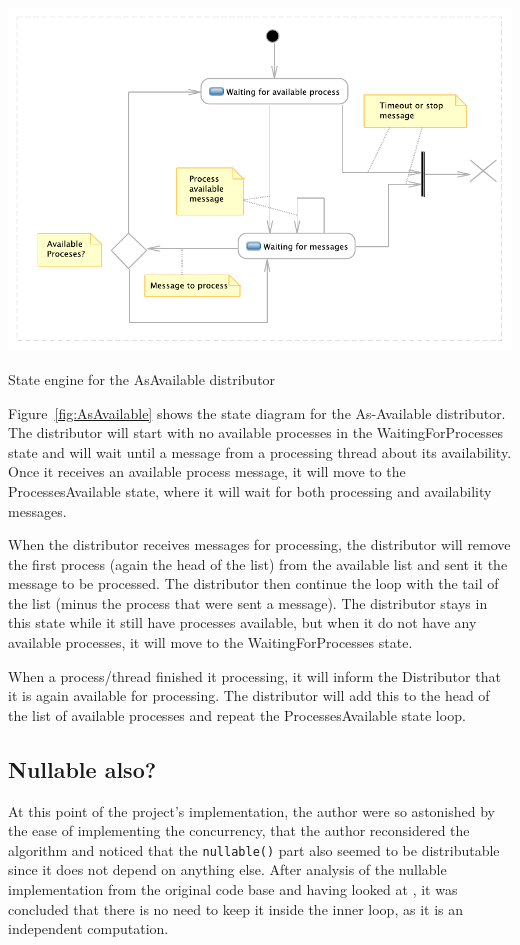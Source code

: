 \documentclass[a4paper,11pt]{report}
\begin{document}
\label{sec:as-available}
\begin{Figure}[htb] %
	 \centering
	 \includegraphics[scale=1]{AsAvailable_states.pdf} 
	 \caption{State engine for the AsAvailable distributor}
	 \label{fig:AsAvailable}
\end{Figure}

Figure~\autoref{fig:AsAvailable} shows the state diagram for the
As-Available distributor. The distributor will start with no available
processes in the WaitingForProcesses state and will wait until a
message from a processing thread about its availability. Once it receives
an available process message, it will move to the ProcessesAvailable
state, where it will wait for both processing and availability messages.

When the distributor receives messages for processing, the distributor
will remove the first process (again the head of the list) from the
available list and sent it the message to be processed. The
distributor then continue the loop with the tail of the list (minus
the process that were sent a message). The distributor stays in this
state while it still have processes available, but when it do not have
any available processes, it will move to the WaitingForProcesses
state.
 
When a process/thread finished it processing, it will inform the
Distributor that it is again available for processing. The distributor
will add this to the head of the list of available processes and
repeat the ProcessesAvailable state loop.


\subsection{Nullable also?}
\label{sec:nullable-also}
At this point of the project's implementation, the author were so
astonished by the ease of implementing the concurrency, that the
author reconsidered the algorithm and noticed that the \texttt{nullable()}
part also seemed to be distributable since it does not depend on
anything else.  After analysis of the nullable implementation from the
original code base and having looked at \cite{watson1995taxonomies},
it was concluded that there is no need to keep it inside the
inner loop, as it is an independent computation.
\end{document}
